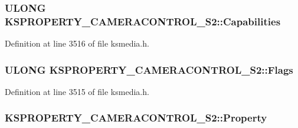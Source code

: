 \subsubsection[{\texorpdfstring{Capabilities}{Capabilities}}]{\setlength{\rightskip}{0pt plus 5cm}U\+L\+O\+NG K\+S\+P\+R\+O\+P\+E\+R\+T\+Y\+\_\+\+C\+A\+M\+E\+R\+A\+C\+O\+N\+T\+R\+O\+L\+\_\+\+S2\+::\+Capabilities}\hypertarget{struct_k_s_p_r_o_p_e_r_t_y___c_a_m_e_r_a_c_o_n_t_r_o_l___s2_a698e827316285e220d57f3e3616d17cf}{}\label{struct_k_s_p_r_o_p_e_r_t_y___c_a_m_e_r_a_c_o_n_t_r_o_l___s2_a698e827316285e220d57f3e3616d17cf}


Definition at line 3516 of file ksmedia.\+h.

\subsubsection[{\texorpdfstring{Flags}{Flags}}]{\setlength{\rightskip}{0pt plus 5cm}U\+L\+O\+NG K\+S\+P\+R\+O\+P\+E\+R\+T\+Y\+\_\+\+C\+A\+M\+E\+R\+A\+C\+O\+N\+T\+R\+O\+L\+\_\+\+S2\+::\+Flags}\hypertarget{struct_k_s_p_r_o_p_e_r_t_y___c_a_m_e_r_a_c_o_n_t_r_o_l___s2_a72aa938a137bca971072ee9b56839c8f}{}\label{struct_k_s_p_r_o_p_e_r_t_y___c_a_m_e_r_a_c_o_n_t_r_o_l___s2_a72aa938a137bca971072ee9b56839c8f}


Definition at line 3515 of file ksmedia.\+h.

\subsubsection[{\texorpdfstring{Property}{Property}}]{ K\+S\+P\+R\+O\+P\+E\+R\+T\+Y\+\_\+\+C\+A\+M\+E\+R\+A\+C\+O\+N\+T\+R\+O\+L\+\_\+\+S2\+::\+Property}\hypertarget{struct_k_s_p_r_o_p_e_r_t_y___c_a_m_e_r_a_c_o_n_t_r_o_l___s2_ababcbf9e0d2b7cffa22a9dbde88b12d5}{}\label{struct_k_s_p_r_o_p_e_r_t_y___c_a_m_e_r_a_c_o_n_t_r_o_l___s2_ababcbf9e0d2b7cffa22a9dbde88b12d5}


